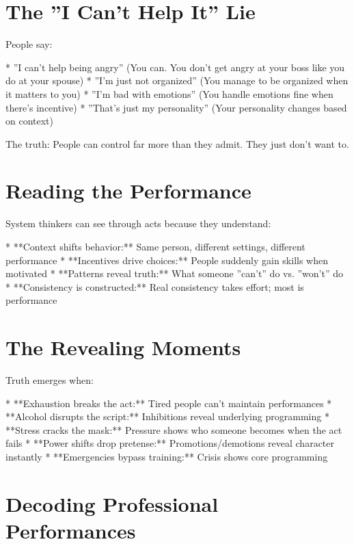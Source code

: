 \documentclass[12pt,oneside]{book}
\begin{document}
\section{The ''I Can't Help It'' Lie}

People say:

                    * ''I can't help being angry'' (You can. You don't get angry at your boss like you do at your spouse)
                    * ''I'm just not organized'' (You manage to be organized when it matters to you)
                    * ''I'm bad with emotions'' (You handle emotions fine when there's incentive)
                    * ''That's just my personality'' (Your personality changes based on context)

The truth: People can control far more than they admit. They just don't want to.

\section{Reading the Performance}

System thinkers can see through acts because they understand:

                    * **Context shifts behavior:** Same person, different settings, different performance
                    * **Incentives drive choices:** People suddenly gain skills when motivated
                    * **Patterns reveal truth:** What someone ''can't'' do vs. ''won't'' do
                    * **Consistency is constructed:** Real consistency takes effort; most is performance

\section{The Revealing Moments}

Truth emerges when:

                    * **Exhaustion breaks the act:** Tired people can't maintain performances
                    * **Alcohol disrupts the script:** Inhibitions reveal underlying programming
                    * **Stress cracks the mask:** Pressure shows who someone becomes when the act fails
                    * **Power shifts drop pretense:** Promotions/demotions reveal character instantly
                    * **Emergencies bypass training:** Crisis shows core programming

\section{Decoding Professional Performances}
\end{document}
